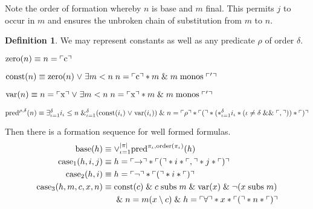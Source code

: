 \documentclass{amsbook}
\newcommand{\exis}[1]{\mathord\exists#1\;}
\newcommand{\conj}{\mathrel\&}
\newcommand{\disj}{\mathrel\vee}
\theoremstyle{definition}
\newtheorem{dfn}{Definition}[section]
\begin{document}
Note the order of formation whereby $n$ is base and $m$ final. This permits $j$ to occur in $m$ and ensures the unbroken chain of substitution from $m$ to $n$.

\begin{dfn}
    We may represent constants as well as any predicate $\rho$ of order $\delta$.
    \begin{description}[
            labelindent=\parindent,
            before={
                    \renewcommand\makelabel[1]{(##1).}
                }
        ]
        \item[zero constant] $\mathrm{zero}(n) \equiv n = \ulcorner\mathrm c\urcorner$
        \item[constant] $\const(n) \equiv \mathrm{zero}(n) \disj \exis{m < n} n = \ord {\mathrm c} * m \conj m \monos \ord'$
        \item[variable] $\mathrm{var}(n) \equiv n = \ord{\mathrm x} \disj \exis{m < n} n = \ord {\mathrm x} * m \conj m \monos \ord'$
        \item[predicative formula] $\pred^{\rho, \delta}(n) \equiv \mathord\exists_{\iota = 1}^\delta i_\iota \leq n\; \&_{\iota = 1}^\delta (\const(i_\iota) \disj \mathrm{var}(i_\iota))
                  \\\conj n = \ord\rho * \ord( * (*_{\iota = 1}^\delta i_\iota * (\iota \neq \delta \mathrel{\&\&} \ord{,})) * \ord)$
    \end{description}
    Then there is a formation sequence for well formed formulas.
    \begin{align*}
        \mathrm{base}(h) \equiv\;               & \mathord\vee_{\iota=1}^{|\pi|} \pred^{\pi_\iota, \mathrm{order}(\pi_\iota)}(h) \\
        \mathrm{case}_1(h, i, j) \equiv\;       & h = \ord{\rightarrow} * \ord( * i * \ord, * j * \ord)                          \\
        \mathrm{case}_2(h, i) \equiv\;          & h = \ord{\neg} * \ord( * i * \ord)                                             \\
        \mathrm{case}_3(h, m, c, x, n) \equiv\; & \const(c) \conj c \subs m \conj \mathrm{var}(x) \conj \neg(x \subs m)          \\
                                                & \conj n = m(x \setminus c) \conj h = \ord{\forall} * x * \ord( * n * \ord)
    \end{align*}
\end{dfn}
\end{document}
